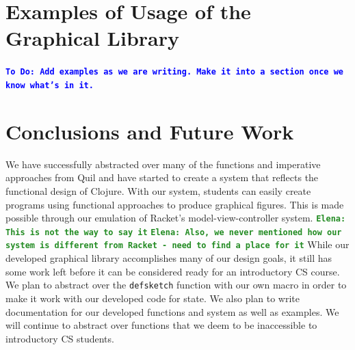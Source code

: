 \documentclass[12pt]{article}
\newcommand{\comment}[1]{{\bf \tt  {#1}}}
\newcommand{\emcomment}[1]{\textcolor{ForestGreen}{\comment{Elena: {#1}}}}
\newcommand{\todo}[1]{\textcolor{blue}{\comment{To Do: {#1}}}}
\begin{document}
\section{Examples of Usage of the Graphical Library}\label{sec:usage}
\todo{Add examples as we are writing.  Make it into a section once we know what's in it.}

\section{Conclusions and Future Work}\label{sec:future-work}
We have successfully  abstracted over many of the functions and imperative approaches from Quil and have started to create a system that reflects the functional design of Clojure. With our system, students can easily create programs using functional approaches to produce graphical figures. This is made possible through our emulation of Racket’s model-view-controller system. \emcomment{This is not the way to say it}
\emcomment{Also, we never mentioned how our system is different from Racket - need to find a place for it} 
While our developed graphical library accomplishes many of our design goals, it still has some work left before it can be considered ready for an introductory CS course. We plan to abstract over the \texttt{defsketch} function with our own macro in order to make it work with our developed code for state. We also plan to write documentation for our developed functions and system as well as examples. We will continue to abstract over functions that we deem to be inaccessible to introductory CS students. %


%
%

%  
%
%




\end{document}
